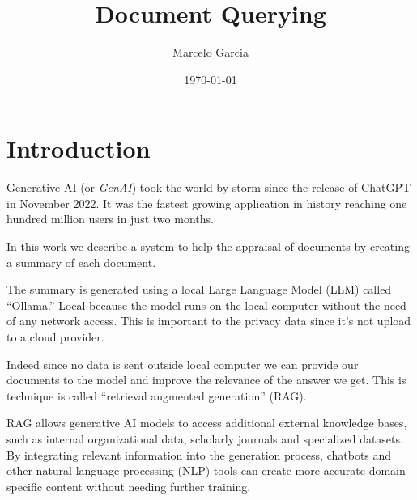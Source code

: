 \documentclass[12pt, a4paper]{article}
\title{Document Querying}
\author{Marcelo Garcia}
\date{\today}
\begin{document}
\maketitle
\section{Introduction}
Generative AI (or \emph{GenAI}) took the world by storm since the release of ChatGPT in November 2022. It was the fastest growing application in history reaching one hundred million users in just two months\cite{chatgpt_grow}. 

In this work we describe a system to help the appraisal of documents by creating a summary of each document.

The summary is generated using a local Large Language Model (LLM) called ``Ollama.'' Local because the model runs on the local computer without the need of any network access. This is important to the privacy data since it's not upload to a cloud provider. 

Indeed since no data is sent outside local computer we can provide our documents to the model and improve the relevance of the answer we get. This is technique is called ``retrieval augmented generation'' (RAG).

RAG allows generative AI models to access additional external knowledge bases, such as internal organizational data, scholarly journals and specialized datasets. By integrating relevant information into the generation process, chatbots and other natural language processing (NLP) tools can create more accurate domain-specific content without needing further training.

\printbibliography
\end{document}
